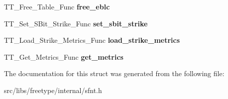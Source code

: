 \begin{DoxyCompactItemize}
\item 
\hypertarget{struct_s_f_n_t___interface___a043a22a8dd45b30dc6e8e5cb7be8dc44}{
TT\_\-Free\_\-Table\_\-Func {\bfseries free\_\-eblc}}
\label{struct_s_f_n_t___interface___a043a22a8dd45b30dc6e8e5cb7be8dc44}

\item 
\hypertarget{struct_s_f_n_t___interface___ab9e73d79753ea4a492c1cf66aee8e518}{
TT\_\-Set\_\-SBit\_\-Strike\_\-Func {\bfseries set\_\-sbit\_\-strike}}
\label{struct_s_f_n_t___interface___ab9e73d79753ea4a492c1cf66aee8e518}

\item 
\hypertarget{struct_s_f_n_t___interface___a285149d0d4f00f2b862e3db45205cfa0}{
TT\_\-Load\_\-Strike\_\-Metrics\_\-Func {\bfseries load\_\-strike\_\-metrics}}
\label{struct_s_f_n_t___interface___a285149d0d4f00f2b862e3db45205cfa0}

\item 
\hypertarget{struct_s_f_n_t___interface___a32ceff5842782c1cf7d7992e40cc858e}{
TT\_\-Get\_\-Metrics\_\-Func {\bfseries get\_\-metrics}}
\label{struct_s_f_n_t___interface___a32ceff5842782c1cf7d7992e40cc858e}

\end{DoxyCompactItemize}


The documentation for this struct was generated from the following file:\begin{DoxyCompactItemize}
\item 
src/libs/freetype/internal/sfnt.h\end{DoxyCompactItemize}
